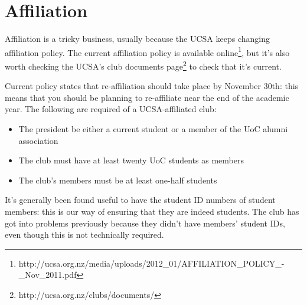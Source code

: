 \section{Affiliation}

Affiliation is a tricky business, usually because the UCSA keeps changing affiliation policy. The current affiliation policy is available online\footnote{http://ucsa.org.nz/media/uploads/2012\_01/AFFILIATION\_POLICY\_-\_Nov\_2011.pdf}, but it's also worth checking the UCSA's club documents page\footnote{http://ucsa.org.nz/clubs/documents/} to check that it's current.

Current policy states that re-affiliation should take place by November 30th: this means that you should be planning to re-affiliate near the end of the academic year. The following are required of a UCSA-affiliated club:

\begin{itemize}
  \item The president be either a current student or a member of the UoC alumni association
  \item The club must have at least twenty UoC students as members
  \item The club's members must be at least one-half students
\end{itemize}

It's generally been found useful to have the student ID numbers of student members: this is our way of ensuring that they are indeed students. The club has got into problems previously because they didn't have members' student IDs, even though this is not technically required.